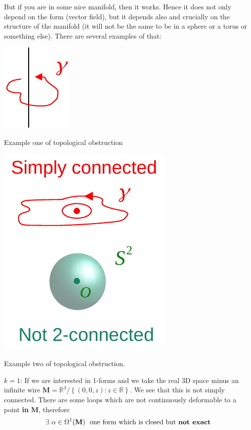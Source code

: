 \documentclass[../main.tex]{subfiles}
\begin{document}
But if you are in some nice manifold, then it works. Hence it does not only depend on the form (vector field), but it depends also and crucially on the structure of the manifold (it will not be the same to be in a sphere or a torus or something else). There are several examples of that:
\begin{marginfigure}[-10mm]
    \centering
	\includegraphics[width=0.5\linewidth]{images/ex1_topol_obstruction.pdf}
	\caption{Example one of topological obstruction}
\end{marginfigure}
\begin{marginfigure}
    \centering
	\includegraphics[width=0.6\linewidth]{images/ex2_topol_obstruction.pdf}
	\caption{Example two of topological obstruction.}
\end{marginfigure}
\begin{example}
\underline{$k=1$}: If we are interested in 1-forms and we take the real 3D space minus an infinite wire $\mathbf{M}=\mathbb{R}^3\slash \left\{\left(0,0,z\right): z\in\mathbb{R}\right\}$. We see that this is not simply connected. There are some loops which are not continuously deformable to a point \textbf{in} $\mathbf{M}$, therefore \[\exists \ \alpha \in \Omega^1(\mathbf{M})\ \textrm{ one form which is closed but \textbf{not exact}}\]
\end{example}
\end{document}
